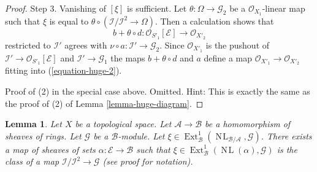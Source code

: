 \documentclass{stacks-project}
\theoremstyle{plain}
\newtheorem{lemma}[subsection]{Lemma}
\theoremstyle{definition}
\theoremstyle{remark}
\numberwithin{equation}{subsection}
\def\Ext{\mathop{\mathrm{Ext}}\nolimits}
\def\NL{\mathop{N\!L}\nolimits}
\begin{document}
\begin{proof}
\medskip\noindent
Step 3. Vanishing of $[\xi]$ is sufficient. Let
$\theta : \Omega \to \mathcal{G}_2$ be a $\mathcal{O}_{X_1}$-linear map
such that $\xi$ is equal to
$\theta \circ (\mathcal{I}/\mathcal{I}^2 \to \Omega)$.
Then a calculation shows that
$$
b + \theta \circ d : \mathcal{O}_{S'_1}[\mathcal{E}] \to \mathcal{O}_{X'_2}
$$
restricted to $\mathcal{I}'$ agrees with
$\nu \circ a : \mathcal{I}' \to \mathcal{G}_2$. Since $\mathcal{O}_{X'_1}$
is the pushout of $\mathcal{I}' \to \mathcal{O}_{S'_1}[\mathcal{E}]$
and $\mathcal{I}' \to \mathcal{G}_1$ the maps $b + \theta \circ d$
and $a$ define a map
$\mathcal{O}_{X'_1} \to \mathcal{O}_{X'_2}$ fitting into
(\ref{equation-huge-2}).

\medskip\noindent
Proof of (2) in the special case above. Omitted. Hint:
This is exactly the same as the proof of (2) of Lemma \ref{lemma-huge-diagram}.
\end{proof}

\begin{lemma}
\label{lemma-NL-represent-ext-class}
Let $X$ be a topological space. Let $\mathcal{A} \to \mathcal{B}$ be a
homomorphism of sheaves of rings. Let $\mathcal{G}$ be a $\mathcal{B}$-module.
Let
$\xi \in \Ext^1_\mathcal{B}(\NL_{\mathcal{B}/\mathcal{A}}, \mathcal{G})$. 
There exists a map of sheaves of sets $\alpha : \mathcal{E} \to \mathcal{B}$
such that $\xi \in \Ext^1_\mathcal{B}(\NL(\alpha), \mathcal{G})$
is the class of a map $\mathcal{I}/\mathcal{I}^2 \to \mathcal{G}$
(see proof for notation).
\end{lemma}
\end{document}
